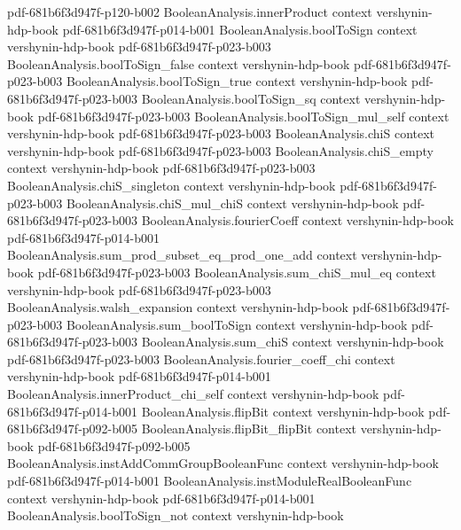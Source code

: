 \begin{theorem}
  {pdf-681b6f3d947f-p120-b002}
\proofstep
  {BooleanAnalysis.innerProduct}
  {context}
  {vershynin-hdp-book}
  {pdf-681b6f3d947f-p014-b001}
\proofstep
  {BooleanAnalysis.boolToSign}
  {context}
  {vershynin-hdp-book}
  {pdf-681b6f3d947f-p023-b003}
\proofstep
  {BooleanAnalysis.boolToSign_false}
  {context}
  {vershynin-hdp-book}
  {pdf-681b6f3d947f-p023-b003}
\proofstep
  {BooleanAnalysis.boolToSign_true}
  {context}
  {vershynin-hdp-book}
  {pdf-681b6f3d947f-p023-b003}
\proofstep
  {BooleanAnalysis.boolToSign_sq}
  {context}
  {vershynin-hdp-book}
  {pdf-681b6f3d947f-p023-b003}
\proofstep
  {BooleanAnalysis.boolToSign_mul_self}
  {context}
  {vershynin-hdp-book}
  {pdf-681b6f3d947f-p023-b003}
\proofstep
  {BooleanAnalysis.chiS}
  {context}
  {vershynin-hdp-book}
  {pdf-681b6f3d947f-p023-b003}
\proofstep
  {BooleanAnalysis.chiS_empty}
  {context}
  {vershynin-hdp-book}
  {pdf-681b6f3d947f-p023-b003}
\proofstep
  {BooleanAnalysis.chiS_singleton}
  {context}
  {vershynin-hdp-book}
  {pdf-681b6f3d947f-p023-b003}
\proofstep
  {BooleanAnalysis.chiS_mul_chiS}
  {context}
  {vershynin-hdp-book}
  {pdf-681b6f3d947f-p023-b003}
\proofstep
  {BooleanAnalysis.fourierCoeff}
  {context}
  {vershynin-hdp-book}
  {pdf-681b6f3d947f-p014-b001}
\proofstep
  {BooleanAnalysis.sum_prod_subset_eq_prod_one_add}
  {context}
  {vershynin-hdp-book}
  {pdf-681b6f3d947f-p023-b003}
\proofstep
  {BooleanAnalysis.sum_chiS_mul_eq}
  {context}
  {vershynin-hdp-book}
  {pdf-681b6f3d947f-p023-b003}
\proofstep
  {BooleanAnalysis.walsh_expansion}
  {context}
  {vershynin-hdp-book}
  {pdf-681b6f3d947f-p023-b003}
\proofstep
  {BooleanAnalysis.sum_boolToSign}
  {context}
  {vershynin-hdp-book}
  {pdf-681b6f3d947f-p023-b003}
\proofstep
  {BooleanAnalysis.sum_chiS}
  {context}
  {vershynin-hdp-book}
  {pdf-681b6f3d947f-p023-b003}
\proofstep
  {BooleanAnalysis.fourier_coeff_chi}
  {context}
  {vershynin-hdp-book}
  {pdf-681b6f3d947f-p014-b001}
\proofstep
  {BooleanAnalysis.innerProduct_chi_self}
  {context}
  {vershynin-hdp-book}
  {pdf-681b6f3d947f-p014-b001}
\proofstep
  {BooleanAnalysis.flipBit}
  {context}
  {vershynin-hdp-book}
  {pdf-681b6f3d947f-p092-b005}
\proofstep
  {BooleanAnalysis.flipBit_flipBit}
  {context}
  {vershynin-hdp-book}
  {pdf-681b6f3d947f-p092-b005}
\proofstep
  {BooleanAnalysis.instAddCommGroupBooleanFunc}
  {context}
  {vershynin-hdp-book}
  {pdf-681b6f3d947f-p014-b001}
\proofstep
  {BooleanAnalysis.instModuleRealBooleanFunc}
  {context}
  {vershynin-hdp-book}
  {pdf-681b6f3d947f-p014-b001}
\proofstep
  {BooleanAnalysis.boolToSign_not}
  {context}
  {vershynin-hdp-book}

\end{theorem}
